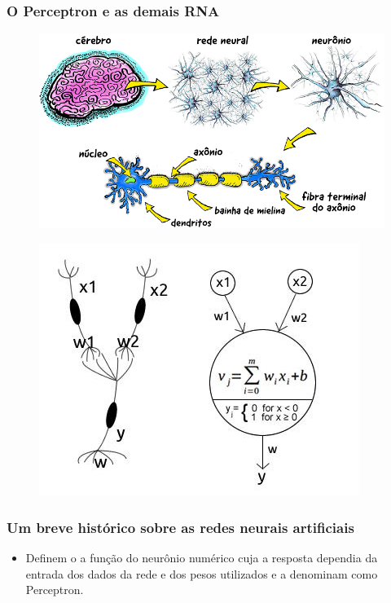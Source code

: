 \documentclass[aspectratio=169]{beamer} %
\begin{document}
\begin{frame}
	\frametitle{O Perceptron e as demais RNA}
	\pause
	\begin{minipage}{0.5\textwidth}
		\begin{figure}
			\centering
			\includegraphics[scale=0.25]{images/redeneural.jpg} %
			\end{figure}
	\end{minipage}%
		\pause
	\begin{minipage}{0.5\textwidth}
		\begin{figure}
			\centering
			\includegraphics[scale=0.5]{images/rnxrna.jpg} %
			\end{figure}
	\end{minipage}
\end{frame}



\begin{frame}
	\frametitle{Um breve histórico sobre as redes neurais artificiais}
	\pause
	\begin{small}
	\end{small}
	\begin{itemize}
		\item Definem o a função do neurônio numérico cuja a resposta dependia da entrada dos dados da rede e dos pesos utilizados e a denominam como Perceptron.
	\end{itemize}	
\end{frame}
\end{document}
